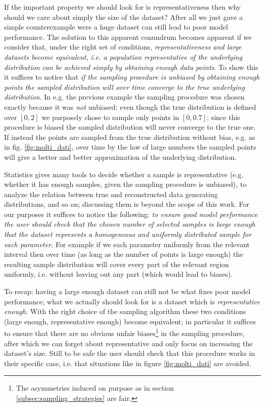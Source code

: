 If the important property we should look for is representativeness then why should we care about simply the size of the dataset? After all we just gave a simple counterexample were a huge dataset can still lead to poor model performance.
The solution to this apparent conundrum becomes apparent if we consider that, under the right set of conditions, \emph{representativeness and large datasets become equivalent, i.e. a population representative of the underlying distribution can be achieved simply by obtaining enough data points}. To show this it suffices to notice that \emph{if the sampling procedure is unbiased by obtaining enough points the sampled distribution will over time converge to the true underlying distribution}. 
In e.g. the previous example the sampling procedure was chosen exactly because it was \emph{not} unbiased: even though the true distribution is defined over $[0, 2]$ we purposely chose to sample only points in $[0, 0.7]$; since this procedure is biased the sampled distribution will never converge to the true one. If instead the points are sampled from the true distribution without bias, e.g. as in fig. \ref{fig:molti_dati}, over time by the law of large numbers the sampled points will give a better and better approximation of the underlying distribution.

Statistics gives many tools to decide whether a sample is representative (e.g. whether it has enough samples, given the sampling procedure is unbiased), to analyze the relation between true and reconstructed data generating distributions, and so on; discussing them is beyond the scope of this work. 
For our purposes it suffices to notice the following: \emph{to ensure good model performance the user should check that the chosen number of selected samples is large enough that the dataset represents a homogeneous and uniformly distributed sample for each parameter}. For example if we each parameter uniformly from the relevant interval then over time (as long as the number of points is large enough) the resulting sample distribution will cover every part of the relevant region uniformly, i.e. without leaving out any part (which would lead to biases).

To recap: having a large enough dataset can still not be what fixes poor model performance; what we actually should look for is a dataset which is \emph{representative enough}. With the right choice of the sampling algorithm these two conditions (large enough, representative enough) become equivalent; in particular it suffices to ensure that there are no obvious unfair biases\footnote{The asymmetries induced on purpose as in section \ref{subsec:sampling_strategies} are fair.} in the sampling procedure, after which we can forget about representative and only focus on increasing the dataset's size. Still to be safe the user should check that this procedure works in their specific case, i.e. that situations like in figure \ref{fig:molti_dati} are avoided.

